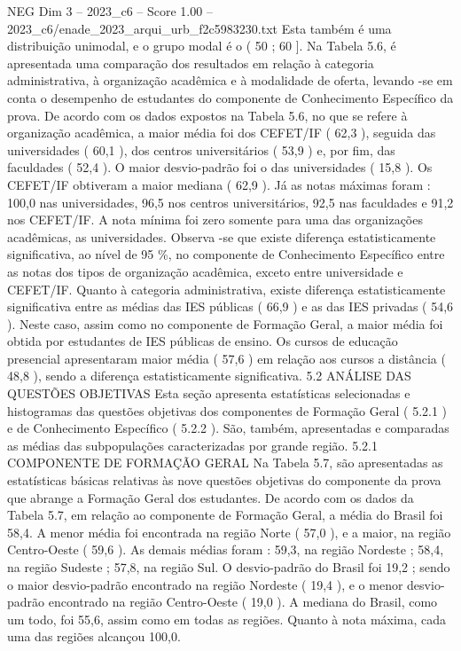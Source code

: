 \begin{textsample}{NEG Dim 3 – 2023\_c6 – Score 1.00 – 2023\_c6/enade\_2023\_arqui\_urb\_f2c5983230.txt}
Esta também é uma distribuição unimodal, e o grupo modal é o ( 50 ; 60 ].
Na Tabela 5.6, é apresentada uma comparação dos resultados em relação à categoria administrativa, à organização acadêmica e à modalidade de oferta, levando -se em conta o desempenho de estudantes do componente de Conhecimento Específico da prova.
De acordo com os dados expostos na Tabela 5.6, no que se refere à organização acadêmica, a maior média foi dos CEFET/IF ( 62,3 ), seguida das universidades ( 60,1 ), dos centros universitários ( 53,9 ) e, por fim, das faculdades ( 52,4 ).
O maior desvio-padrão foi o das universidades ( 15,8 ).
Os CEFET/IF obtiveram a maior mediana ( 62,9 ).
Já as notas máximas foram : 100,0 nas universidades, 96,5 nos centros universitários, 92,5 nas faculdades e 91,2 nos CEFET/IF.
A nota mínima foi zero somente para uma das organizações acadêmicas, as universidades.
Observa -se que existe diferença estatisticamente significativa, ao nível de 95 \%, no componente de Conhecimento Específico entre as notas dos tipos de organização acadêmica, exceto entre universidade e CEFET/IF.
Quanto à categoria administrativa, existe diferença estatisticamente significativa entre as médias das IES públicas ( 66,9 ) e as das IES privadas ( 54,6 ).
Neste caso, assim como no componente de Formação Geral, a maior média foi obtida por estudantes de IES públicas de ensino.
Os cursos de educação presencial apresentaram maior média ( 57,6 ) em relação aos cursos a distância ( 48,8 ), sendo a diferença estatisticamente significativa. 5.2 ANÁLISE DAS QUESTÕES OBJETIVAS Esta seção apresenta estatísticas selecionadas e histogramas das questões objetivas dos componentes de Formação Geral ( 5.2.1 ) e de Conhecimento Específico ( 5.2.2 ).
São, também, apresentadas e comparadas as médias das subpopulações caracterizadas por grande região. 5.2.1 COMPONENTE DE FORMAÇÃO GERAL Na Tabela 5.7, são apresentadas as estatísticas básicas relativas às nove questões objetivas do componente da prova que abrange a Formação Geral dos estudantes.
De acordo com os dados da Tabela 5.7, em relação ao componente de Formação Geral, a média do Brasil foi 58,4.
A menor média foi encontrada na região Norte ( 57,0 ), e a maior, na região Centro-Oeste ( 59,6 ).
As demais médias foram : 59,3, na região Nordeste ; 58,4, na região Sudeste ; 57,8, na região Sul.
O desvio-padrão do Brasil foi 19,2 ; sendo o maior desvio-padrão encontrado na região Nordeste ( 19,4 ), e o menor desvio-padrão encontrado na região Centro-Oeste ( 19,0 ).
A mediana do Brasil, como um todo, foi 55,6, assim como em todas as regiões.
Quanto à nota máxima, cada uma das regiões alcançou 100,0.

\end{textsample}
